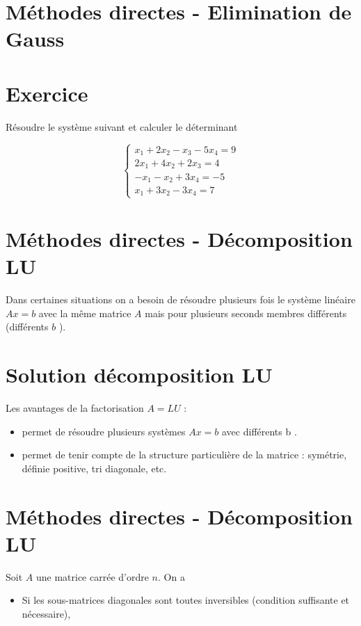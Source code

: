 \documentclass[10pt]{article}
\begin{document}
\section*{Méthodes directes - Elimination de Gauss}
\section*{Exercice}
Résoudre le système suivant et calculer le déterminant

\[
\left\{\begin{array}{c}
x_{1}+2 x_{2}-x_{3}-5 x_{4}=9 \\
2 x_{1}+4 x_{2}+2 x_{3}=4 \\
-x_{1}-x_{2}+3 x_{4}=-5 \\
x_{1}+3 x_{2}-3 x_{4}=7
\end{array}\right.
\]

\section*{Méthodes directes - Décomposition LU}
Dans certaines situations on a besoin de résoudre plusieurs fois le système linéaire \(A x=b\) avec la même matrice \(A\) mais pour plusieurs seconds membres différents (différents \(b\) ).

\section*{Solution décomposition LU}
Les avantages de la factorisation \(A=L U\) :

\begin{itemize}
  \item permet de résoudre plusieurs systèmes \(A x=b\) avec différents b .
  \item permet de tenir compte de la structure particulière de la matrice : symétrie, définie positive, tri diagonale, etc.
\end{itemize}

\section*{Méthodes directes - Décomposition LU}
Soit \(A\) une matrice carrée d'ordre \(n\). On a

\begin{itemize}
  \item Si les sous-matrices diagonales sont toutes inversibles (condition suffisante et nécessaire),
\end{itemize}
\end{document}

